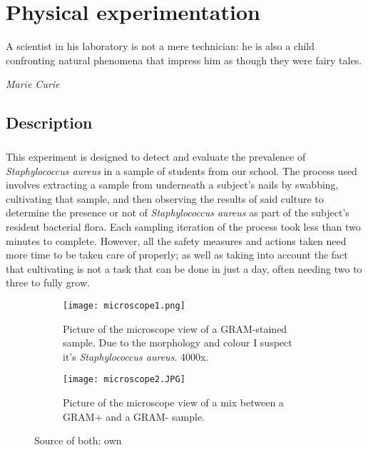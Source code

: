 \chapter{Physical experimentation}
\epigraph{A scientist in his laboratory is not a mere technician: he is also a child confronting natural phenomena that impress him as though they were fairy tales.}{\textit{Marie Curie}}
\section{Description}
\paragraph{}This experiment is designed to detect and evaluate the prevalence of \emph{Staphylococcus aureus} in a sample of students from our school. The process used involves extracting a sample from underneath a subject's nails by swabbing, cultivating that sample, and then observing the results of said culture to determine the presence or not of \emph{Staphylococcus aureus} as part of the subject's resident bacterial flora. Each sampling iteration of the process took less than two minutes to complete. However, all the safety measures and actions taken need more time to be taken care of properly; as well as taking into account the fact that cultivating is not a task that can be done in just a day, often needing two to three to fully grow.
\begin{figure}[H] \centering \begin{subfigure}[b]{0.4\linewidth} \texttt{[image: microscope1.png]} \caption{Picture of the microscope view of a GRAM-stained sample. Due to the morphology and colour I suspect it's \emph{Staphylococcus aureus}. 4000x.} \end{subfigure} \begin{subfigure}[b]{0.4\linewidth} \texttt{[image: microscope2.JPG]} \caption{Picture of the microscope view of a mix between a GRAM+ and a GRAM- sample.} \end{subfigure} \caption{Source of both: own} \end{figure}\newpage
